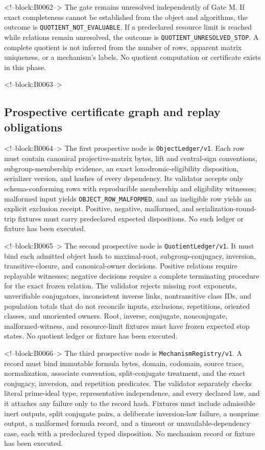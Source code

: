 \documentclass[11pt,a4paper]{article}
\begin{document}
<!--block:B0062-->
The gate remains unresolved independently of Gate M. If exact completeness cannot be established from the object and algorithms, the outcome is \texttt{QUOTIENT\_NOT\_EVALUABLE}. If a predeclared resource limit is reached while relations remain unresolved, the outcome is \texttt{QUOTIENT\_UNRESOLVED\_STOP}. A complete quotient is not inferred from the number of rows, apparent matrix uniqueness, or a mechanism's labels. No quotient computation or certificate exists in this phase.

<!--block:B0063-->
\subsection{Prospective certificate graph and replay obligations}

<!--block:B0064-->
The first prospective node is \texttt{ObjectLedger/v1}. Each row must contain canonical projective-matrix bytes, lift and central-sign conventions, subgroup-membership evidence, an exact loxodromic-eligibility disposition, serializer version, and hashes of every dependency. Its validator accepts only schema-conforming rows with reproducible membership and eligibility witnesses; malformed input yields \texttt{OBJECT\_ROW\_MALFORMED}, and an ineligible row yields an explicit exclusion receipt. Positive, negative, malformed, and serialization-round-trip fixtures must carry predeclared expected dispositions. No such ledger or fixture has been executed.

<!--block:B0065-->
The second prospective node is \texttt{QuotientLedger/v1}. It must bind each admitted object hash to maximal-root, subgroup-conjugacy, inversion, transitive-closure, and canonical-owner decisions. Positive relations require replayable witnesses; negative decisions require a complete terminating procedure for the exact frozen relation. The validator rejects missing root exponents, unverifiable conjugators, inconsistent inverse links, nontransitive class IDs, and population totals that do not reconcile inputs, exclusions, repetitions, oriented classes, and unoriented owners. Root, inverse, conjugate, nonconjugate, malformed-witness, and resource-limit fixtures must have frozen expected stop states. No quotient ledger or fixture has been executed.

<!--block:B0066-->
The third prospective node is \texttt{MechanismRegistry/v1}. A record must bind immutable formula bytes, domain, codomain, source trace, normalization, associate convention, split-conjugate treatment, and the exact conjugacy, inversion, and repetition predicates. The validator separately checks literal prime-ideal type, representative independence, and every declared law, and it attaches any failure only to the record hash. Fixtures must include admissible inert outputs, split conjugate pairs, a deliberate inversion-law failure, a nonprime output, a malformed formula record, and a timeout or unavailable-dependency case, each with a predeclared typed disposition. No mechanism record or fixture has been executed.
\end{document}
